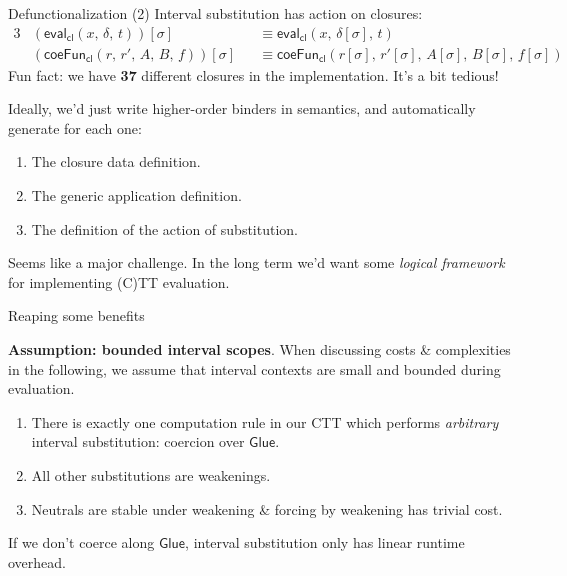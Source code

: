 \documentclass[dvipsnames]{beamer}
\newcommand{\ms}[1]{\mathsf{#1}}
\newcommand{\eval}{\ms{eval}}
\newcommand{\Glue}{\ms{Glue}}
\begin{document}
\begin{frame}{Defunctionalization (2)}
Interval substitution has action on closures:
\begin{alignat*}{3}
  & (\eval_{\ms{cl}}(x,\,\delta,\,t))[\sigma] && \equiv \eval_{\ms{cl}}(x,\,\delta[\sigma],\,t) \\
  & (\ms{coeFun}_{\ms{cl}}(r,\,r',\,A,\,B,\,f))[\sigma] && \equiv \ms{coeFun}_{\ms{cl}}(r[\sigma],\,r'[\sigma],\,A[\sigma],\,B[\sigma],\,f[\sigma])
\end{alignat*}
\pause
Fun fact: we have \textbf{37} different closures in the implementation. It's a bit tedious!
\vspace{1em}
\pause

Ideally, we'd just write higher-order binders in semantics, and automatically
generate for each one:
\begin{enumerate}
  \item The closure data definition.
  \item The generic application definition.
  \item The definition of the action of substitution.
\end{enumerate}
\vspace{0.5em}
\pause

Seems like a major challenge. In the long term we'd want some \emph{logical framework}
for implementing (C)TT evaluation.
\end{frame}

\begin{frame}{Reaping some benefits}

\textbf{Assumption: bounded interval scopes}. When discussing costs \&
complexities in the following, we assume that interval contexts are small and
bounded during evaluation.
\vspace{1em}
\pause

\begin{enumerate}
\item There is exactly one computation rule in our CTT which performs \emph{arbitrary}
      interval substitution: coercion over $\Glue$.
\pause
\item All other substitutions are weakenings.
\pause
\item Neutrals are stable under weakening \& forcing by weakening has trivial cost.

\end{enumerate}
\vspace{1em}
\pause
\begin{block}{}
  If we don't coerce along $\Glue$, interval substitution only has linear
  runtime overhead.
\end{block}

\end{frame}
\end{document}
